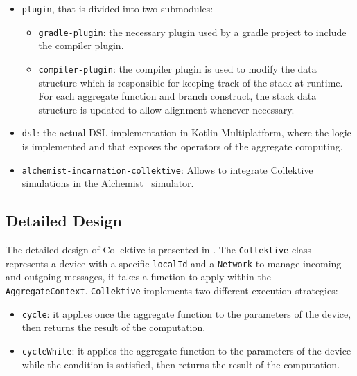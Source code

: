 \begin{itemize}
    \item \texttt{plugin}, that is divided into two submodules:
    \begin{itemize}
        \item \texttt{gradle-plugin}: the necessary plugin used by a gradle project to include the compiler plugin.
        \item \texttt{compiler-plugin}: the compiler plugin is used to modify the data structure which is responsible for keeping track of the stack at runtime. For each aggregate function and branch construct, the stack data structure is updated to allow alignment whenever necessary.
    \end{itemize}
    \item \texttt{dsl}: the actual DSL implementation in Kotlin Multiplatform, where the logic is implemented and that exposes the operators of the aggregate computing.
    \item \texttt{alchemist-incarnation-collektive}: Allows to integrate Collektive simulations in the Alchemist~\cite{Pianini2013} simulator.
\end{itemize}

\subsection{Detailed Design}

The detailed design of Collektive is presented in . The \texttt{Collektive} class represents a device with a specific \texttt{localId} and a \texttt{Network} to manage incoming and outgoing messages, it takes a function to apply within the \texttt{AggregateContext}. \texttt{Collektive} implements two different execution strategies:

\begin{itemize}
    \item \texttt{cycle}: it applies once the aggregate function to the parameters of the device, then returns the result of the computation.
    \item \texttt{cycleWhile}: it applies the aggregate function to the parameters of the device while the condition is satisfied, then returns the result of the computation.
\end{itemize}

